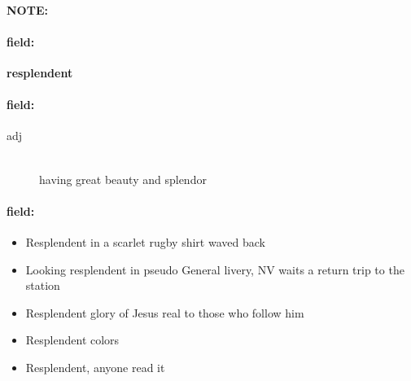 \documentclass[12pt]{article}
\newenvironment{note}{\paragraph{NOTE:}}{}
\newenvironment{field}{\paragraph{field:}}{}
\begin{document}
\begin{note}
\begin{field}
\textbf{\large resplendent}
\end{field}


\begin{field}
\begin{description}
\item[adj] \hfill \\ 
having great beauty and splendor

\end{description}
\end{field}

\begin{field}
\begin{itemize}
\item Resplendent in a scarlet rugby shirt waved back
\item Looking resplendent in pseudo General livery, NV waits a return trip to the station
\item Resplendent glory of Jesus real to those who follow him
\item Resplendent colors
\item Resplendent, anyone read it
\end{itemize}
\end{field}
\end{note}
\end{document}
